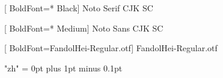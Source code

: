 [
	BoldFont=* Black]
{Noto Serif CJK SC}	%

[
	BoldFont=* Medium]
{Noto Sans CJK SC}	%

[
	BoldFont=FandolHei-Regular.otf]
{FandolHei-Regular.otf}	%

\XeTeXlinebreaklocale "zh"
\XeTeXlinebreakskip = 0pt plus 1pt minus 0.1pt

\newcommand\kaishu{\CJKfamily{kai}} %
\newcommand\songti{\CJKfamily{song}} %
\newcommand\heiti{\CJKfamily{hei}}	%
\newcommand\thmheiti{\CJKfamily{hei2}}	%
\newcommand\fangsong{\CJKfamily{fangsong}} %
\renewcommand{\em}{\bfseries\mathversion{bold}\CJKfamily{emfont}} %
